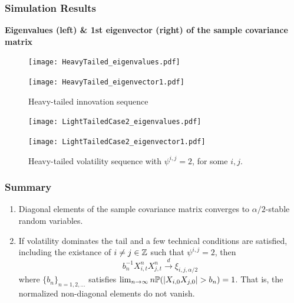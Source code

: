 \documentclass{beamer}
\begin{document}
\begin{frame}
  \frametitle{Simulation Results}
  {\bf\scriptsize Eigenvalues (left) \& 1st eigenvector (right) of the sample covariance matrix}
  \begin{figure}[htb]
    \centering
    \begin{minipage}{0.35\linewidth}
      \texttt{[image: HeavyTailed\_eigenvalues.pdf]}
    \end{minipage}\hfill
    \begin{minipage}{0.35\linewidth}
      \texttt{[image: HeavyTailed\_eigenvector1.pdf]}      
    \end{minipage}\hfill
    \begin{minipage}{0.25\linewidth}
      {\small Heavy-tailed innovation sequence}      
    \end{minipage}
    \begin{minipage}{0.35\linewidth}
      \texttt{[image: LightTailedCase2\_eigenvalues.pdf]}
    \end{minipage}\hfill
    \begin{minipage}{0.35\linewidth}
      \texttt{[image: LightTailedCase2\_eigenvector1.pdf]}
    \end{minipage}\hfill
    \begin{minipage}{0.25\linewidth}
        {\small Heavy-tailed volatility sequence with $\psi^{i,j} = 2$, for some $i, j$.}
    \end{minipage}
  \end{figure}
\end{frame}

\begin{frame}
  \frametitle{Summary}
  \begin{enumerate}
  \item Diagonal elements of the sample covariance matrix converges to $\alpha/2$-stable
    random variables.
  \item If volatility dominates the tail and a few technical conditions are satisfied, including
    the existance of $i \neq j \in \integers$ such that $\psi^{i,j} = 2$, then
    \[
    b_n^{-1} X^{n}_{i,t} X^{n}_{j,t} \overset{d}{\to} \xi_{i,j, \alpha/2}
    \]
    where $\{b_n\}_{n=1,2,\dots}$ satisfies
    $\lim_{n \to \infty} n \P(|X_{i,0} X_{j,0}| > b_n) = 1$.
    That is, the normalized non-diagonal elements do not vanish.
  \end{enumerate}
\end{frame}
\end{document}
